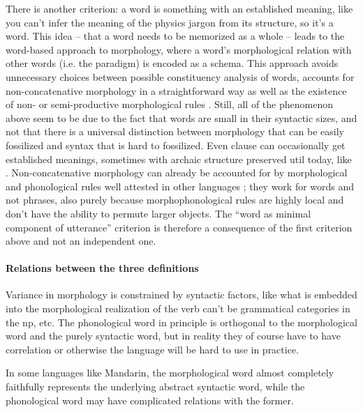 {There is another criterion: 
a word is something with an established meaning,
like you can't infer the meaning of the physics jargon  
from its structure, so it's a word.
This idea -- that a word needs to be memorized as a whole -- 
leads to the word-based approach to morphology,
where a word's morphological relation with other words (i.e. the paradigm)
is encoded as a schema.
This approach avoids unnecessary choices between possible constituency analysis of words,
accounts for non-concatenative morphology in a straightforward way
as well as the existence of non- or semi-productive morphological rules
\citep[]{haspelmath2013understanding}.
Still, all of the phenomenon above
seem to be due to the fact that 
words are small in their syntactic sizes, 
and not that there is a universal distinction 
between morphology that can be easily fossilized 
and syntax that is hard to fossilized.
Even clause can occasionally get established meanings,
sometimes with archaic structure preserved util today,
like .
Non-concatenative morphology can already be accounted for 
by morphological and phonological rules well attested in other languages 
\citep{tucker2011morphosyntax};
they work for words and not phrases, 
also purely because morphophonological rules are highly local 
and don't have the ability to permute larger objects.
The ``word as minimal component of utterance'' 
criterion is therefore a consequence of the first criterion above 
and not an independent one.

\paragraph{Relations between the three definitions} 
Variance in morphology is constrained by syntactic factors,
like what is embedded into the morphological realization of the verb 
can't be grammatical categories in the \acs{np}, etc.
The phonological word in principle is orthogonal to 
the morphological word and the purely syntactic word,
but in reality they of course have to have correlation
or otherwise the language will be hard to use in practice.

In some languages like Mandarin, 
the morphological word almost completely faithfully represents 
the underlying abstract syntactic word, 
while the phonological word may have complicated relations with the former.

}
